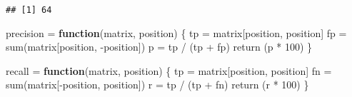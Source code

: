 \documentclass[
]{article}
\newenvironment{Shaded}{\begin{snugshade}}{\end{snugshade}}
\newcommand{\ControlFlowTok}[1]{\textcolor[rgb]{0.13,0.29,0.53}{\textbf{#1}}}
\newcommand{\DecValTok}[1]{\textcolor[rgb]{0.00,0.00,0.81}{#1}}
\newcommand{\FunctionTok}[1]{\textcolor[rgb]{0.00,0.00,0.00}{#1}}
\newcommand{\NormalTok}[1]{#1}
\newcommand{\OtherTok}[1]{\textcolor[rgb]{0.56,0.35,0.01}{#1}}
\newcommand{\SpecialCharTok}[1]{\textcolor[rgb]{0.00,0.00,0.00}{#1}}
\begin{document}
\begin{verbatim}
## [1] 64
\end{verbatim}

\begin{Shaded}
\begin{Highlighting}[]
\NormalTok{precision }\OtherTok{=} \ControlFlowTok{function}\NormalTok{(matrix, position)}
\NormalTok{\{}
\NormalTok{  tp }\OtherTok{=}\NormalTok{ matrix[position, position]}
\NormalTok{  fp }\OtherTok{=} \FunctionTok{sum}\NormalTok{(matrix[position, }\SpecialCharTok{{-}}\NormalTok{position])}
\NormalTok{  p }\OtherTok{=}\NormalTok{ tp }\SpecialCharTok{/}\NormalTok{ (tp }\SpecialCharTok{+}\NormalTok{ fp)}
  \FunctionTok{return}\NormalTok{ (p }\SpecialCharTok{*} \DecValTok{100}\NormalTok{)}
\NormalTok{\}}

\NormalTok{recall }\OtherTok{=} \ControlFlowTok{function}\NormalTok{(matrix, position)}
\NormalTok{\{}
\NormalTok{  tp }\OtherTok{=}\NormalTok{ matrix[position, position]}
\NormalTok{  fn }\OtherTok{=} \FunctionTok{sum}\NormalTok{(matrix[}\SpecialCharTok{{-}}\NormalTok{position, position])}
\NormalTok{  r }\OtherTok{=}\NormalTok{ tp }\SpecialCharTok{/}\NormalTok{ (tp }\SpecialCharTok{+}\NormalTok{ fn)}
  \FunctionTok{return}\NormalTok{ (r }\SpecialCharTok{*} \DecValTok{100}\NormalTok{)}
\NormalTok{\}}


\end{Highlighting}
\end{Shaded}
\end{document}
